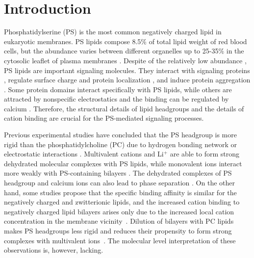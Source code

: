 \documentclass[aps,prl,superscriptaddress,twocolumn]{revtex4}
\begin{document}
\section{Introduction}
Phosphatidylserine (PS) is the most common negatively
charged lipid in eukaryotic membranes.
PS lipids compose 8.5\% of total lipid weight of red blood cells,
but the abundance varies between different organelles up to
25-35\% in the cytosolic leaflet of plasma membranes \cite{lemmon08,leventis10,li14}.
Despite of the relatively low abundance , PS lipids
are important signaling molecules. They interact with
signaling proteins \cite{leventis10}, regulate
surface charge and protein localization \cite{yeung08}, and
induce protein aggregation \cite{zhao04,gorbenko06}.
Some protein domains interact specifically with PS lipids,
while others are attracted by nonspecific electrostatics and the
binding can be regulated by calcium \cite{leventis10}.
Therefore, the structural details
of lipid headgroups and the details of cation binding
are crucial for the PS-mediated signaling processes.

Previous experimental studies have concluded that the
PS headgroup is more rigid than the phosphatidylcholine (PC)
due to hydrogen bonding network or
electrostatic interactions \cite{browning80,buldt81}.
Multivalent cations and Li$^+$ are able to form strong
dehydrated molecular complexes with PS lipids,
while monovalent ions interact more weakly with
PS-containing bilayers \cite{hauser77,kurland79,eisenberg79,hauser83,dluhy83,hauser85,feigenson86,mattai89,roux90,roux91,boettcher11}.
The dehydrated complexes of PS headgroup and calcium ions can also lead to
phase separation \cite{hauser77,kurland79,hauser85,feigenson86,mattai89,roux90,roux91}.
On the other hand, some studies propose that the specific binding
affinity is similar for the negatively charged and zwitterionic lipids, and
the increased cation binding to negatively charged lipid bilayers arises only due
to the increased local cation concentration in the membrane vicinity~\cite{seelig90,sinn06}.
Dilution of bilayers with PC lipids makes PS headgroups
less rigid and reduces their propensity to form
strong complexes with multivalent ions~\cite{browning80,buldt81,roux90,roux91}.
The molecular level interpretation of these observations is,
however, lacking.
\end{document}
